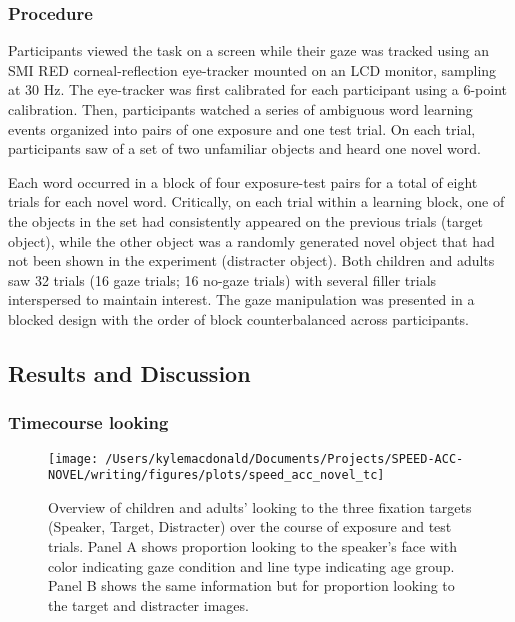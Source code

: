 \documentclass[10pt, letterpaper]{article}
\newenvironment{CodeChunk}{}{}
\begin{document}
\hypertarget{procedure-1}{%
\subsubsection{Procedure}\label{procedure-1}}

Participants viewed the task on a screen while their gaze was tracked
using an SMI RED corneal-reflection eye-tracker mounted on an LCD
monitor, sampling at 30 Hz. The eye-tracker was first calibrated for
each participant using a 6-point calibration. Then, participants watched
a series of ambiguous word learning events organized into pairs of one
exposure and one test trial. On each trial, participants saw of a set of
two unfamiliar objects and heard one novel word.

Each word occurred in a block of four exposure-test pairs for a total of
eight trials for each novel word. Critically, on each trial within a
learning block, one of the objects in the set had consistently appeared
on the previous trials (target object), while the other object was a
randomly generated novel object that had not been shown in the
experiment (distracter object). Both children and adults saw 32 trials
(16 gaze trials; 16 no-gaze trials) with several filler trials
interspersed to maintain interest. The gaze manipulation was presented
in a blocked design with the order of block counterbalanced across
participants.

\hypertarget{results-and-discussion-1}{%
\subsection{Results and Discussion}\label{results-and-discussion-1}}

\hypertarget{timecourse-looking}{%
\subsubsection{Timecourse looking}\label{timecourse-looking}}

\begin{CodeChunk}
\begin{figure*}[t]

{\centering \texttt{[image: /Users/kylemacdonald/Documents/Projects/SPEED-ACC-NOVEL/writing/figures/plots/speed\_acc\_novel\_tc]} 

}

\caption[Overview of children and adults' looking to the three fixation targets (Speaker, Target, Distracter) over the course of exposure and test trials]{Overview of children and adults' looking to the three fixation targets (Speaker, Target, Distracter) over the course of exposure and test trials. Panel A shows proportion looking to the speaker's face with color indicating gaze condition and line type indicating age group. Panel B shows the same information but for proportion looking to the target and distracter images.}\label{fig:san-tc-plot}
\end{figure*}
\end{CodeChunk}
\end{document}
